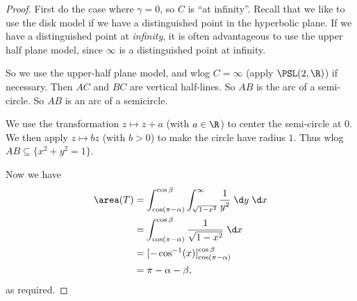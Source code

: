 \documentclass[a4paper]{article}
\begin{document}
\begin{proof}
  First do the case where $\gamma = 0$, so $C$ is ``at infinity''. Recall that we like to use the disk model if we have a distinguished point in the hyperbolic plane. If we have a distinguished point at \emph{infinity}, it is often advantageous to use the upper half plane model, since $\infty$ is a distinguished point at infinity.

  So we use the upper-half plane model, and wlog $C = \infty$ (apply $\PSL(2, \R)$) if necessary. Then $AC$ and $BC$ are vertical half-lines. So $AB$ is the arc of a semi-circle. So $AB$ is an arc of a semicircle.
  \begin{center}
  \end{center}
  We use the transformation $z \mapsto z + a$ (with $a \in \R$) to center the semi-circle at $0$. We then apply $z \mapsto bz$ (with $b > 0$) to make the circle have radius $1$. Thus wlog $AB \subseteq \{x^2 + y^2 = 1\}$.

  Now we have
  \begin{align*}
    \area(T) &= \int_{\cos (\pi - \alpha)}^{\cos \beta} \int_{\sqrt{1 - x^2}}^\infty \frac{1}{y^2}\;\d y\;\d x\\
    &= \int_{\cos (\pi - \alpha)}^{\cos \beta} \frac{1}{\sqrt{1 - x^2}} \;\d x \\
    &= [-\cos^{-1}(x)]_{\cos(\pi - \alpha)}^{\cos \beta}\\
    &= \pi - \alpha - \beta,
  \end{align*}
  as required.


\end{proof}
\end{document}
